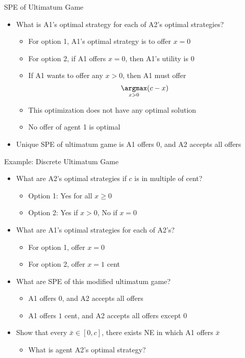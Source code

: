 \documentclass[11pt,aspectratio=169,handout]{beamer}
\begin{document}
  
  \begin{frame}{SPE of Ultimatum Game}
   \begin{itemize}[<+->]
   \setlength{\itemsep}{1em}
    \item What is A1's optimal strategy for each of A2's optimal strategies?
    \begin{itemize}
    \setlength{\itemsep}{0.5em}
     \item For option 1, A1's optimal strategy is to offer $x = 0$
     \item For option 2, if A1 offers $x=0$, then A1's utility is $0$
     \item If A1 wants to offer any $x > 0$, then A1 must offer 
     $$\underset{x > 0}{\argmax} (c - x)$$
     \item This optimization does not have any optimal solution
     \item \alert{No offer of agent 1 is optimal}
    \end{itemize}
    \item Unique SPE of ultimatum game is \alert{A1 offers 0, and A2 accepts all offers}
   \end{itemize}
  \end{frame}


  \begin{frame}{Example: Discrete Ultimatum Game}
   \begin{itemize}[<+->]
   \setlength{\itemsep}{1.2em}
    \item What are A2's optimal strategies if $c$ is in multiple of cent?
    \begin{itemize}
     \item \alert{Option 1}: Yes for all $x \geq 0$
     \item \alert{Option 2}: Yes if $x > 0$, No if $x = 0$
    \end{itemize}
    \item What are A1's optimal strategies for each of A2's?
    \begin{itemize}
     \item For option 1, offer $x = 0$
     \item For option 2, offer $x = 1$ cent
    \end{itemize}
    \item What are SPE of this modified ultimatum game?
    \begin{itemize}
     \item A1 offers $0$, and A2 accepts all offers
     \item A1 offers $1$ cent, and A2 accepts all offers except $0$
    \end{itemize}
    \item Show that every $\bar{x} \in [0, c]$, there exists NE in which A1 offers $\bar{x}$
    \begin{itemize}
     \item What is agent A2's optimal strategy?
    \end{itemize}
   \end{itemize}
  \end{frame}
\end{document}
